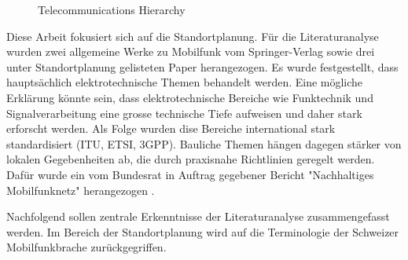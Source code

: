 \begin{figure}[h]
    \centering
    \caption{Telecommunications Hierarchy}
    \label{fig:telecommunications_hierarchy}
\end{figure}


\begin{German}
    Diese Arbeit fokusiert sich auf die Standortplanung. Für die Literaturanalyse wurden zwei allgemeine Werke zu Mobilfunk vom Springer-Verlag \cite{behnkeGrundkursMobilfunkUnd2022,jiangCellularCommunicationNetworks2024} sowie drei unter Standortplanung gelisteten Paper \cite{engelsDimensioningCellSite2013,ahamed5GNetworkCoverage2021,huangAutomaticCellPlanning2000} herangezogen. Es wurde festgestellt, dass hauptsächlich elektrotechnische Themen behandelt werden. Eine mögliche Erklärung könnte sein, dass elektrotechnische Bereiche wie Funktechnik und Signalverarbeitung eine grosse technische Tiefe aufweisen und daher stark erforscht werden. Als Folge wurden dise Bereiche international stark standardisiert (ITU, ETSI, 3GPP). Bauliche Themen hängen dagegen stärker von lokalen Gegebenheiten ab, die durch praxisnahe Richtlinien geregelt werden. Dafür wurde ein vom Bundesrat in Auftrag gegebener Bericht "Nachhaltiges Mobilfunknetz" herangezogen \cite{bundesratNachhaltigesMobilfunknetzBericht2022}.

    Nachfolgend sollen zentrale Erkenntnisse der Literaturanalyse zusammengefasst werden. Im Bereich der Standortplanung wird auf die Terminologie der Schweizer Mobilfunkbrache zurückgegriffen.
\end{German}

